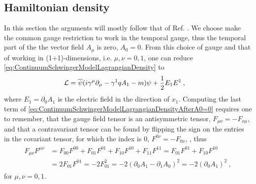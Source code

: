 \documentclass[../main.tex]{subfiles} %
\begin{document}
\subsection{Hamiltonian density} \label{sec:ContinuumSchwingerModelHamiltonianDensity}

In this section the arguments will mostly follow that of Ref. \cite{melnikov_latticeSchwingerModel_2000}. We choose make the common gauge restriction to work in the temporal gauge, thus the temporal part of the the vector field $A_\mu$ is zero, $A_0 = 0$. From this choice of gauge and that of working in (1+1)-dimensions, i.e. $\mu,\nu = 0,1$, one can reduce \cref{eq:ContinuumSchwingerModelLagrangianDensity} to
\begin{align} \label{eq:ContinuumSchwingerModelLagrangianDensityAfterA0=0}
    \mathcal{L} &= \overline{\psi} (i \gamma^\mu \partial_\mu - \gamma^1 q A_1 - m) \psi + \frac{1}{2}E_1E^1 \: ,
\end{align}
where $E_1 = \partial_0 A_1$ is the electric field in the direction of $x_1$. Computing the last term of \cref{eq:ContinuumSchwingerModelLagrangianDensityAfterA0=0} requires one to remember, that the gauge field tensor is an antisymmetric tensor, $F_{\mu\nu} = - F_{\nu\mu}$, and that a contravariant tensor can be found by flipping the sign on the entries in the covariant tensor, for which the index is $0$, $F^{0\nu} = -F_{0\nu}$, \cite{griffiths_introToEldyn_2017}, thus
\begin{align}
\begin{split}
    F_{\mu\nu}F^{\mu\nu} &= F_{00}F^{00} + F_{01}F^{01} + F_{10}F^{10} + F_{11}F^{11}     = F_{01}F^{01} + F_{10}F^{10} \\
        &= 2F_{01}F^{01}
        = -2F_{01}^2
        = -2(\partial_0A_1 - \partial_1A_0)^2
        = -2(\partial_0A_1)^2 \: ,
\end{split}
\end{align}
for $\mu,\nu = 0,1$.
\end{document}
